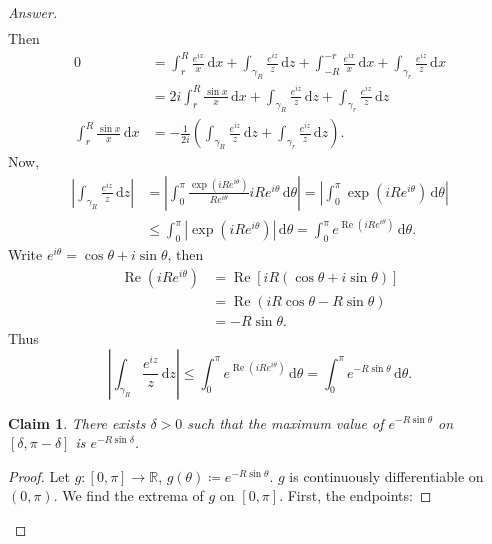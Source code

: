 \documentclass[12pt]{article}
\newcommand{\real}{\mathbb{R}}
\newcommand\paren[1]{\left( #1 \right)}
\newcommand{\sqbrack}[1]{\left [ #1 \right ]}
\newtheorem*{claim}{Claim}
\theoremstyle{definition}
\DeclareMathOperator\re{Re}
\begin{document}
\begin{enumerate}
\begin{proof}[Answer]
\begin{align*}
        \end{align*}
        Then 
        \begin{align*}
            0 & = \int_r^R \frac{e^{ix}}{x} \, \mathrm{d}x + \int_{\gamma_R} \frac{e^{iz}}{z} \, \mathrm{d}z + \int_{-R}^{-r} \frac{e^{ix}}{x} \, \mathrm{d}x + \int_{\gamma_r} \frac{e^{iz}}{z} \, \mathrm{d}x \\
            & = 2i \int_r^R \frac{ \sin x}{x} \, \mathrm{d}x + \int_{\gamma_R} \frac{e^{iz}}{z} \, \mathrm{d}z + \int_{\gamma_r} \frac{e^{iz}}{z} \, \mathrm{d}z \\
            \int_r^R \frac{ \sin x}{x} \, \mathrm{d}x & = -\frac{1}{2i} \paren{ \int_{\gamma_R} \frac{e^{iz}}{z} \, \mathrm{d}z + \int_{\gamma_r} \frac{e^{iz}}{z} \, \mathrm{d}z }.
        \end{align*}
        Now, 
        \begin{align*}
            \left| \int_{\gamma_R} \frac{e^{iz}}{z} \, \mathrm{d}z \right| & = \left| \int_0^{\pi} \frac{ \exp \paren{ iR e^{i \theta} } }{ Re^{i \theta} } i R e^{i \theta} \, \mathrm{d}\theta \right| = \left| \int_0^{\pi} \exp \paren{ iR e^{i \theta} } \, \mathrm{d}\theta \right| \\
            & \leq \int_0^{\pi} \left| \exp \paren{ iR e^{i \theta} } \right| \, \mathrm{d} \theta = \int_0^{\pi} e^{ \re \paren{ iR e^{i \theta} } } \, \mathrm{d} \theta.
        \end{align*}
        Write $e^{i \theta} = \cos \theta + i \sin \theta$, then 
        \begin{align*}
            \re \paren{ iR e^{i \theta} } & = \re \sqbrack{ i R \paren{ \cos \theta + i \sin \theta } } \\
            & = \re \paren{ iR \cos \theta - R \sin \theta } \\
            & = -R \sin \theta.
        \end{align*}
        Thus 
        \[
            \left| \int_{\gamma_R} \frac{e^{iz}}{z} \, \mathrm{d}z \right| \leq \int_0^{\pi} e^{ \re \paren{ iR e^{i \theta} } } \, \mathrm{d} \theta = \int_0^{\pi} e^{ -R \sin \theta } \, \mathrm{d} \theta.
        \]
        \begin{claim}
            There exists $\delta > 0$ such that the maximum value of $e^{ -R \sin \theta }$ on $[\delta, \pi - \delta]$ is $e^{ -R \sin \delta }$.
        \end{claim}
        \begin{proof}
            Let $g : [0,\pi] \to \real$, $g(\theta) \coloneqq e^{ -R \sin \theta }$. $g$ is continuously differentiable on $(0,\pi)$. We find the extrema of $g$ on $[0,\pi]$. First, the endpoints:

\end{proof}
\end{proof}
\end{enumerate}
\end{document}
